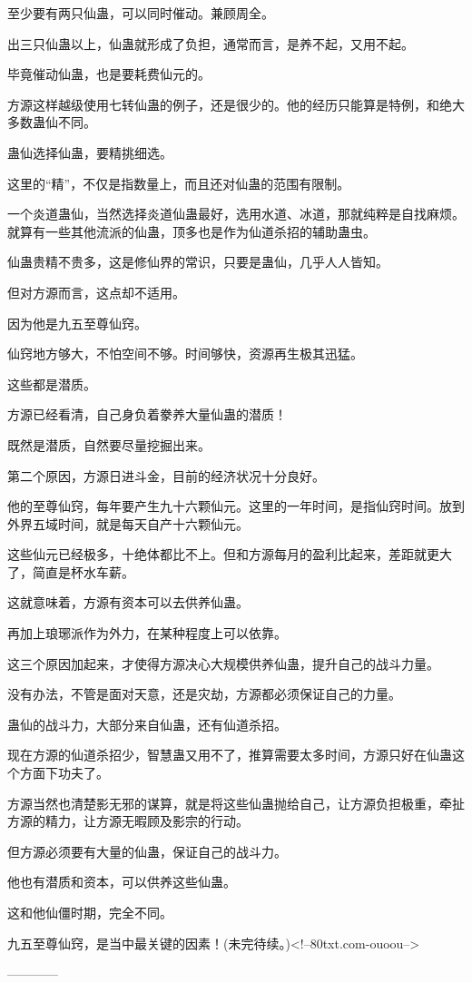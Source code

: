 \begin{this_body}
至少要有两只仙蛊，可以同时催动。兼顾周全。

出三只仙蛊以上，仙蛊就形成了负担，通常而言，是养不起，又用不起。

毕竟催动仙蛊，也是要耗费仙元的。

方源这样越级使用七转仙蛊的例子，还是很少的。他的经历只能算是特例，和绝大多数蛊仙不同。

蛊仙选择仙蛊，要精挑细选。

这里的“精”，不仅是指数量上，而且还对仙蛊的范围有限制。

一个炎道蛊仙，当然选择炎道仙蛊最好，选用水道、冰道，那就纯粹是自找麻烦。就算有一些其他流派的仙蛊，顶多也是作为仙道杀招的辅助蛊虫。

仙蛊贵精不贵多，这是修仙界的常识，只要是蛊仙，几乎人人皆知。

但对方源而言，这点却不适用。

因为他是九五至尊仙窍。

仙窍地方够大，不怕空间不够。时间够快，资源再生极其迅猛。

这些都是潜质。

方源已经看清，自己身负着豢养大量仙蛊的潜质！

既然是潜质，自然要尽量挖掘出来。

第二个原因，方源日进斗金，目前的经济状况十分良好。

他的至尊仙窍，每年要产生九十六颗仙元。这里的一年时间，是指仙窍时间。放到外界五域时间，就是每天自产十六颗仙元。

这些仙元已经极多，十绝体都比不上。但和方源每月的盈利比起来，差距就更大了，简直是杯水车薪。

这就意味着，方源有资本可以去供养仙蛊。

再加上琅琊派作为外力，在某种程度上可以依靠。

这三个原因加起来，才使得方源决心大规模供养仙蛊，提升自己的战斗力量。

没有办法，不管是面对天意，还是灾劫，方源都必须保证自己的力量。

蛊仙的战斗力，大部分来自仙蛊，还有仙道杀招。

现在方源的仙道杀招少，智慧蛊又用不了，推算需要太多时间，方源只好在仙蛊这个方面下功夫了。

方源当然也清楚影无邪的谋算，就是将这些仙蛊抛给自己，让方源负担极重，牵扯方源的精力，让方源无暇顾及影宗的行动。

但方源必须要有大量的仙蛊，保证自己的战斗力。

他也有潜质和资本，可以供养这些仙蛊。

这和他仙僵时期，完全不同。

九五至尊仙窍，是当中最关键的因素！(未完待续。)<!--80txt.com-ouoou-->

------------

\end{this_body}

